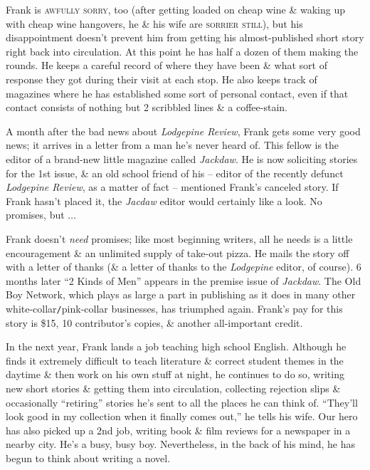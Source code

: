 \documentclass{article}
\numberwithin{equation}{section}
\begin{document}
Frank is \textsc{awfully sorry}, too (after getting loaded on cheap wine \& waking up with cheap wine hangovers, he \& his wife are \textsc{sorrier still}), but his disappointment doesn't prevent him from getting his almost-published short story right back into circulation. At this point he has half a dozen of them making the rounds. He keeps a careful record of where they have been \& what sort of response they got during their visit at each stop. He also keeps track of magazines where he has established some sort of personal contact, even if that contact consists of nothing but 2 scribbled lines \& a coffee-stain.

A month after the bad news about \textit{Lodgepine Review}, Frank gets some very good news; it arrives in a letter from a man he's never heard of. This fellow is the editor of a brand-new little magazine called \textit{Jackdaw}. He is now soliciting stories for the 1st issue, \& an old school friend of his -- editor of the recently defunct \textit{Lodgepine Review}, as a matter of fact -- mentioned Frank's canceled story. If Frank hasn't placed it, the \textit{Jacdaw} editor would certainly like a look. No promises, but $\ldots$

Frank doesn't \textit{need} promises; like most beginning writers, all he needs is a little encouragement \& an unlimited supply of take-out pizza. He mails the story off with a letter of thanks (\& a letter of thanks to the \textit{Lodgepine} editor, of course). 6 months later ``2 Kinds of Men'' appears in the premise issue of \textit{Jackdaw}. The Old Boy Network, which plays as large a part in publishing as it does in many other white-collar{\tt/}pink-collar businesses, has triumphed again. Frank's pay for this story is \$15, 10 contributor's copies, \& another all-important credit.

In the next year, Frank lands a job teaching high school English. Although he finds it extremely difficult to teach literature \& correct student themes in the daytime \& then work on his own stuff at night, he continues to do so, writing new short stories \& getting them into circulation, collecting rejection slips \& occasionally ``retiring'' stories he's sent to all the places he can think of. ``They'll look good in my collection when it finally comes out,'' he tells his wife. Our hero has also picked up a 2nd job, writing book \& film reviews for a newspaper in a nearby city. He's a busy, busy boy. Nevertheless, in the back of his mind, he has begun to think about writing a novel.
\end{document}
